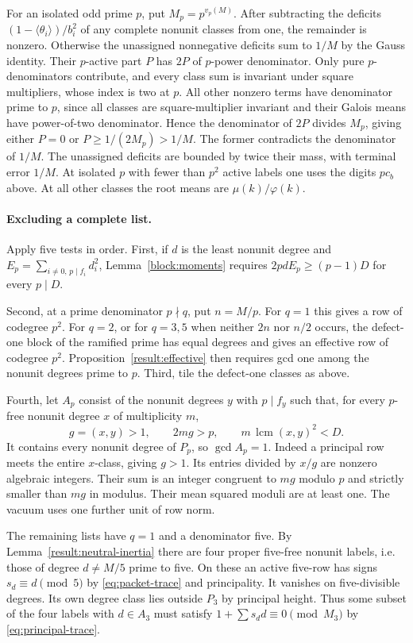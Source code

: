\documentclass[11pt]{amsart}
\numberwithin{equation}{section}
\theoremstyle{definition}
\theoremstyle{plain}
\DeclareMathOperator{\lcm}{lcm}
\begin{document}
For an isolated odd prime $p$, put
$M_p=p^{v_p(M)}$. After subtracting the deficits
$(1-\langle\theta_i\rangle)/b_i^2$ of any complete nonunit classes
from one, the remainder is nonzero. Otherwise the unassigned
nonnegative deficits sum to $1/M$ by the Gauss identity.
Their $p$-active part $P$ has $2P$ of $p$-power denominator. Only
pure $p$-denominators contribute, and every class sum is invariant
under square multipliers, whose index is two at $p$. All other
nonzero terms have denominator prime to $p$, since all classes are
square-multiplier invariant and their Galois means have
power-of-two denominator. Hence the denominator of $2P$ divides
$M_p$, giving either $P=0$ or $P\ge1/(2M_p)>1/M$.
The former contradicts the denominator of $1/M$. The unassigned
deficits are bounded by twice their mass, with terminal error $1/M$.
At isolated $p$ with fewer than $p^2$ active labels one uses
the digits $pc_b$ above. At all other classes the root means are
$\mu(k)/\varphi(k)$.

\paragraph{Excluding a complete list.}
Apply five tests in order. First, if $d$ is the least nonunit degree and
$E_p=\sum_{i\ne0,\,p\mid f_i}d_i^2$, Lemma~\ref{block:moments} requires
$2pdE_p\ge(p-1)D$ for every $p\mid D$.

Second, at a prime denominator $p\nmid q$, put $n=M/p$. For $q=1$ this
gives a row of codegree $p^2$. For $q=2$, or for $q=3,5$ when neither
$2n$ nor $n/2$ occurs, the defect-one block of the ramified prime has
equal degrees and gives an effective row of codegree $p^2$.
Proposition~\ref{result:effective} then requires gcd one
among the nonunit degrees prime to $p$.
Third, tile the defect-one classes as above.

Fourth, let $A_p$ consist of the nonunit degrees $y$ with $p\mid f_y$ such
that, for every $p$-free nonunit degree $x$ of multiplicity $m$,
\[
 g=(x,y)>1,\qquad 2mg>p,\qquad m\,\lcm(x,y)^2<D .
\]
It contains every nonunit degree of $P_p$, so $\gcd A_p=1$.
Indeed a principal row meets the entire $x$-class, giving $g>1$.
Its entries divided by $x/g$ are nonzero algebraic integers.
Their sum is an integer congruent to $mg$ modulo $p$ and strictly
smaller than $mg$ in modulus. Their mean squared moduli are at
least one. The vacuum uses one further unit of row norm.

The remaining lists have $q=1$ and a denominator five. By
Lemma~\ref{result:neutral-inertia} there are four proper five-free
nonunit labels, i.e. those of degree $d\ne M/5$ prime to five.
On these an active five-row has signs $s_d\equiv d\pmod5$
by \eqref{eq:packet-trace} and principality. It vanishes on
five-divisible degrees. Its own degree class lies outside $P_3$
by principal height. Thus some subset of the four labels with
$d\in A_3$ must satisfy $1+\sum s_d d\equiv0\pmod{M_3}$
by \eqref{eq:principal-trace}.
\end{document}
